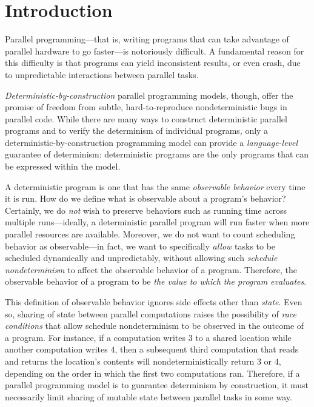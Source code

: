 \chapter{Introduction}\label{ch:intro} %

Parallel programming---that is, writing programs that can take
advantage of parallel hardware to go faster---is notoriously
difficult.  A fundamental reason for this difficulty is that programs
can yield inconsistent results, or even crash, due to unpredictable
interactions between parallel tasks.

\emph{Deterministic-by-construction} parallel programming models,
though, offer the promise of freedom from subtle, hard-to-reproduce
nondeterministic bugs in parallel code.  While there are many ways to
construct deterministic parallel programs and to verify the
determinism of individual programs, only a
deterministic-by-construction programming model can provide a
\emph{language-level} guarantee of determinism: deterministic programs
are the only programs that can be expressed within the model.

A deterministic program is one that has the same \emph{observable
  behavior} every time it is run.  How do we define what is observable
about a program's behavior?  Certainly, we do \emph{not} wish to
preserve behaviors such as running time across multiple
runs---ideally, a deterministic parallel program will run faster when
more parallel resources are available.  Moreover, we do not want to
count scheduling behavior as observable---in fact, we want to
specifically \emph{allow} tasks to be scheduled dynamically and
unpredictably, without allowing such \emph{schedule nondeterminism} to
affect the observable behavior of a program.  Therefore,  the observable behavior of a program to be
\emph{the value to which the program evaluates}.


This definition of observable behavior ignores side effects other than
\emph{state}.  Even so, sharing of state between parallel computations
raises the possibility of \emph{race conditions} that allow schedule
nondeterminism to be observed in the outcome of a program.  For
instance, if a computation writes $3$ to a shared location while
another computation writes $4$, then a subsequent third computation
that reads and returns the location's contents will
nondeterministically return $3$ or $4$, depending on the order in
which the first two computations ran.  Therefore, if a parallel
programming model is to guarantee determinism by construction, it must
necessarily limit sharing of mutable state between parallel tasks in
some way.

